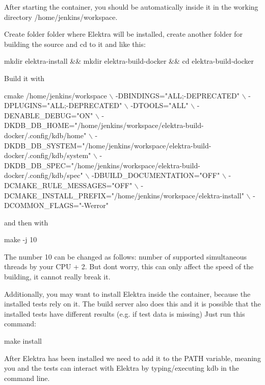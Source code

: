 After starting the container, you should be automatically inside it in the working directory {\ttfamily /home/jenkins/workspace}.

Create folder folder where Elektra will be installed, create another folder for building the source and {\ttfamily cd} to it and like this\+:


\begin{DoxyCode}
mkdir elektra-install && mkdir elektra-build-docker && cd elektra-build-docker
\end{DoxyCode}


Build it with


\begin{DoxyCode}
 cmake /home/jenkins/workspace \(\backslash\)
-DBINDINGS="ALL;-DEPRECATED" \(\backslash\)
-DPLUGINS="ALL;-DEPRECATED" \(\backslash\)
-DTOOLS="ALL" \(\backslash\)
-DENABLE\_DEBUG="ON" \(\backslash\)
-DKDB\_DB\_HOME="/home/jenkins/workspace/elektra-build-docker/.config/kdb/home" \(\backslash\)
-DKDB\_DB\_SYSTEM="/home/jenkins/workspace/elektra-build-docker/.config/kdb/system" \(\backslash\)
-DKDB\_DB\_SPEC="/home/jenkins/workspace/elektra-build-docker/.config/kdb/spec" \(\backslash\)
-DBUILD\_DOCUMENTATION="OFF" \(\backslash\)
-DCMAKE\_RULE\_MESSAGES="OFF" \(\backslash\)
-DCMAKE\_INSTALL\_PREFIX="/home/jenkins/workspace/elektra-install" \(\backslash\)
-DCOMMON\_FLAGS="-Werror"
\end{DoxyCode}


and then with


\begin{DoxyCode}
make -j 10
\end{DoxyCode}


The number 10 can be changed as follows\+: number of supported simultaneous threads by your C\+PU + 2. But don\textquotesingle{}t worry, this can only affect the speed of the building, it cannot really break it.

Additionally, you may want to install Elektra inside the container, because the installed tests rely on it. The build server also does this and it is possible that the installed tests have different results (e.\+g. if test data is missing) Just run this command\+:


\begin{DoxyCode}
make install
\end{DoxyCode}


After Elektra has been installed we need to add it to the P\+A\+TH variable, meaning you and the tests can interact with Elektra by typing/executing {\ttfamily kdb} in the command line.


